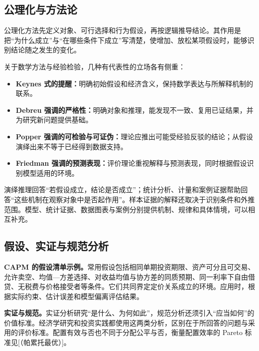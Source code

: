 \subsection{公理化与方法论}
公理化方法先定义对象、可行选择和行为假设，再按逻辑推导结论。其作用是把“为什么成立”与“在哪些条件下成立”写清楚，使增加、放松某项假设时，能够识别结论随之发生的变化。

关于数学方法与经验检验，几种有代表性的立场各有侧重：
\begin{itemize}
 \item \textbf{Keynes 式的提醒：}明确初始假设和经济含义，保持数学表达与所解释机制的联系。
 \item \textbf{Debreu 强调的严格性：}明确对象和推理，能发现不一致、复用已证结果，并为研究新问题提供基础。
 \item \textbf{Popper 强调的可检验与可证伪：}理论应推出可能受经验反驳的结论；从假设演绎出来不等于已经得到数据支持。
 \item \textbf{Friedman 强调的预测表现：}评价理论重视解释与预测表现，同时根据假设识别模型适用的环境。
\end{itemize}
演绎推理回答“若假设成立，结论是否成立”；统计分析、计量和案例证据帮助回答“这些机制在观察对象中是否起作用”。样本证据的解释还取决于识别条件和外推范围。模型、统计证据、数据图表与案例分别提供机制、规律和具体情境，可以相互补充。

\subsection{假设、实证与规范分析}
\textbf{CAPM 的假设清单示例。}常用假设包括相同单期投资期限、资产可分且可交易、允许卖空、均值—方差选择、对收益均值与协方差的同质预期、同一利率下自由借贷、无税费与价格接受者等条件。它们共同界定定价关系成立的环境。应用时，根据实际约束、估计误差和模型偏离评估结果。

\textbf{实证与规范。}实证分析研究“是什么、为何如此”，规范分析还须引入“应当如何”的价值标准。经济学研究和投资实践都使用这两类分析，区别在于所回答的问题与采用的评价标准。配置有效与否也不同于分配公平与否，衡量配置效率的 Pareto 标准见[（帕累托最优）]。


